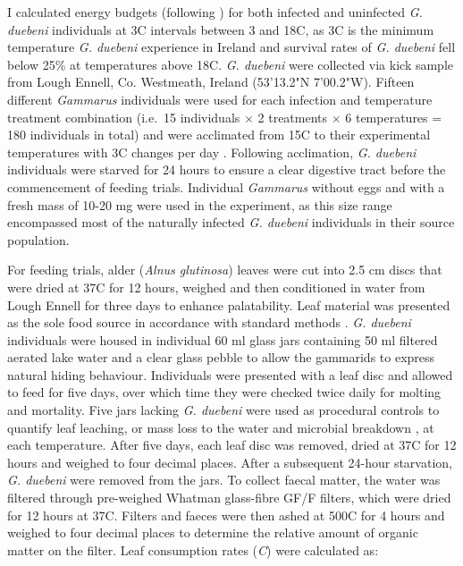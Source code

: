 I calculated energy budgets (following \citet{nilsson1974}) for both infected and uninfected \emph{G. duebeni} individuals at 3\degree C intervals between 3 and 18\degree C, as 3\degree C is the minimum temperature \emph{G. duebeni} experience in Ireland and survival rates of \emph{G. duebeni} fell below 25\% at temperatures above 18\degree C. \emph{G. duebeni} were collected via kick sample from Lough Ennell, Co. Westmeath, Ireland (53'13.2"N 7'00.2"W). Fifteen different \emph{Gammarus} individuals were used for each infection and temperature treatment combination (i.e.\ 15 individuals $\times$ 2 treatments $\times$ 6 temperatures = 180 individuals in total) and were acclimated from 15\degree C to their experimental temperatures with 3\degree C changes per day \citep{penk2016}. Following acclimation, \emph{G. duebeni} individuals were starved for 24 hours to ensure a clear digestive tract before the commencement of feeding trials. Individual \emph{Gammarus} without eggs and with a fresh mass of 10-20 mg were used in the experiment, as this size range encompassed most of the naturally infected \emph{G. duebeni} individuals in their source population.

For feeding trials, alder (\emph{Alnus glutinosa}) leaves were cut into 2.5 cm discs that were dried at 37\degree C for 12 hours, weighed and then conditioned in water from Lough Ennell for three days to enhance palatability. Leaf material was presented as the sole food source in accordance with standard methods \citep{agatz2014}. \emph{G. duebeni} individuals were housed in individual 60 ml glass jars containing 50 ml filtered aerated lake water and a clear glass pebble to allow the gammarids to express natural hiding behaviour. Individuals were presented with a leaf disc and allowed to feed for five days, over which time they were checked twice daily for molting and mortality. Five jars lacking \emph{G. duebeni} were used as procedural controls to quantify leaf leaching, or mass loss to the water and microbial breakdown \citep{webster1986}, at each temperature. After five days, each leaf disc was removed, dried at 37\degree C for 12 hours and weighed to four decimal places. After a subsequent 24-hour starvation, \emph{G. duebeni} were removed from the jars. To collect faecal matter, the water was filtered through pre-weighed Whatman glass-fibre GF/F filters, which were dried for 12 hours at 37\degree C. Filters and faeces were then ashed at 500\degree C for 4 hours and weighed to four decimal places to determine the relative amount of organic matter on the filter.  Leaf consumption rates (\emph{C}) were calculated as:

